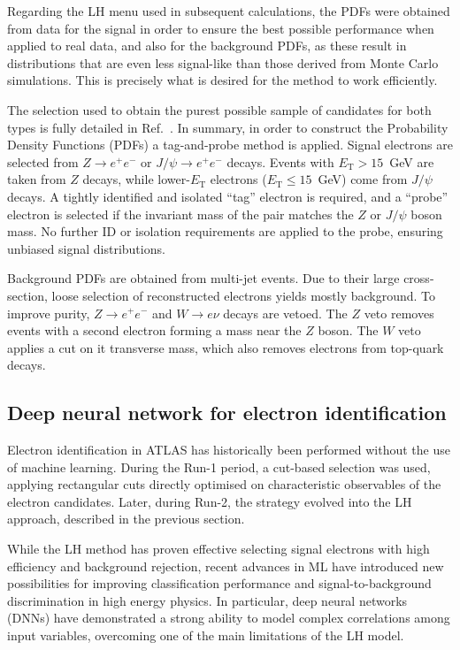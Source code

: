 Regarding the LH menu used in subsequent calculations, the PDFs were obtained from data for the signal in order to ensure the best possible performance when applied to real data, and also for the background PDFs, as these result in distributions that are even less signal-like than those derived from Monte Carlo simulations. This is precisely what is desired for the method to work efficiently.

The selection used to obtain the purest possible sample of candidates for both types is fully detailed in Ref.~\cite{lucas_thesis}. In summary, in order to construct the Probability Density Functions (PDFs) a tag-and-probe method is applied. Signal electrons are selected from $Z \rightarrow e^{+}e^{-}$ or $J/\psi \rightarrow e^{+}e^{-}$ decays. Events with $E_{\text{T}} > 15$~GeV are taken from $Z$ decays, while lower-$E_{\text{T}}$ electrons ($E_{\text{T}} \leq 15$~GeV) come from $J/\psi$ decays. A tightly identified and isolated “tag” electron is required, and a “probe” electron is selected if the invariant mass of the pair matches the $Z$ or $J/\psi$ boson mass. No further ID or isolation requirements are applied to the probe, ensuring unbiased signal distributions.

Background PDFs are obtained from multi-jet events. Due to their large cross-section, loose selection of reconstructed electrons yields mostly background. To improve purity, $Z \rightarrow e^{+}e^{-}$ and $W \rightarrow e\nu$ decays are vetoed. The $Z$ veto removes events with a second electron forming a mass near the $Z$ boson. The $W$ veto applies a cut on it transverse mass, which also removes electrons from top-quark decays.


\subsection{Deep neural network for electron identification}

Electron identification in ATLAS has historically been performed without the use of machine learning. During the Run-1 period, a cut-based selection was used, applying rectangular cuts directly optimised on characteristic observables of the electron candidates. Later, during Run-2, the strategy evolved into the LH approach, described in the previous section.

While the LH method has proven effective selecting signal electrons with high efficiency and background rejection, recent advances in ML have introduced new possibilities for improving classification performance and signal-to-background discrimination in high energy physics. In particular, deep neural networks (DNNs) have demonstrated a strong ability to model complex correlations among input variables, overcoming one of the main limitations of the LH model.

